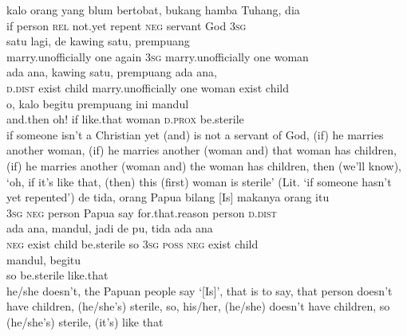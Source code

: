 \ea
\gll   kalo    {orang}    {yang}    {blum}    {bertobat,}    {bukang}    {hamba}    {Tuhang,}    {dia}\\
  if    {person}    {\textsc{rel}}    {not.yet}    {repent}    {\textsc{neg}}    {servant}    {God}    {\textsc{3sg}}\\
    {satu}   lagi,    {de}    {kawing}    {satu,}    {prempuang}\\
   {marry.unofficially}    {one}   again    {\textsc{3sg}}    {marry.unofficially}    {one}    {woman}\\
    {ada}    {ana,}    {kawing}    {satu,}    {prempuang}    {ada}   ana,\\
   {\textsc{d.dist}}    {exist}    {child}    {marry.unofficially}    {one}    {woman}    {exist}   child\\
    {o,}    {kalo}    {begitu}    {prempuang}    {ini}    {mandul}\\
   {and.then}    {oh!}    {if}    {like.that}    {woman}    {\textsc{d.prox}}    {be.sterile}\\
\glt
if someone isn’t a Christian yet (and) is not a servant of God, (if) he marries another woman, (if) he marries another (woman and) that woman has children, (if) he marries another (woman and) the woman has children, then (we’ll know), ‘oh, if it’s like that, (then) this (first) woman is sterile’ (Lit. ‘if someone hasn’t yet repented’)
\z
\ea
\gll   de    {tida,}    {orang}    {Papua}    {bilang}    {[Is]}    {makanya}    {orang}   itu\\
  \textsc{3sg}    {\textsc{neg}}    {person}    {Papua}    {say}    {}    {for.that.reason}    {person}   \textsc{d.dist}\\
    {ada}    {ana,}    {mandul,}    {jadi}    {de}   pu,    {tida}   ada    {ana}\\
   {\textsc{neg}}    {exist}    {child}    {be.sterile}    {so}    {\textsc{3sg}}   \textsc{poss}    {\textsc{neg}}   exist    {child}\\
    {mandul,}    {begitu}\\
   {so}    {be.sterile}    {like.that}\\
\glt
he/she doesn’t, the Papuan people say ‘[Is]’, that is to say, that person doesn’t have children, (he/she’s) sterile, so, his/her, (he/she) doesn’t have children, so (he/she’s) sterile, (it’s) like that
\z %


